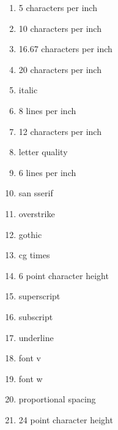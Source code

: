 \documentclass[10pt,letterpaper,twoside]{report}
\begin{document}
{{{{\begin{enumerate}
\begin{enumerate}
		      \item 5 characters per inch
		            
		      \item 10 characters per inch
		            
		      \item 16.67 characters per inch
		            
		      \item 20 characters per inch
		            
		      \item italic
		            
		      \item 8 lines per inch
		            
		      \item 12 characters per inch
		            
		      \item letter quality
		            
		      \item 6 lines per inch
		            
		      \item san sserif
		            
		      \item overstrike
		            
		      \item gothic
		            
		      \item cg times
		            
		      \item 6 point character height
		            
		      \item superscript
		            
		      \item subscript
		            
		      \item underline
		            
		      \item font v
		            
		      \item font w
		            
		      \item proportional spacing
		            
		      \item 24 point character height
		            

\end{enumerate}
\end{enumerate}}}}}
\end{document}
